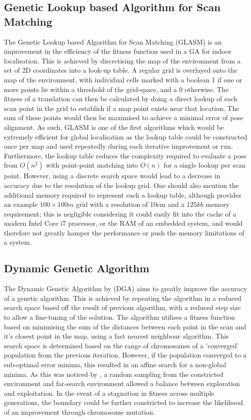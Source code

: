 \documentclass[authoryearcitations]{UoYCSproject}
\begin{document}
\subsection{Genetic Lookup based Algorithm for Scan Matching}
The Genetic Lookup based Algorithm for Scan Matching (GLASM) \cite{Lenac2007-xm} is an improvement in the efficiency of the fitness function used in a GA for indoor localisation. This is achieved by discretising the map of the environment from a set of 2D coordinates into a look-up table. A regular grid is overlayed onto the map of the environment, with individual cells marked with a boolean 1 if one or more points lie within a threshold of the grid-space, and a 0 otherwise. The fitness of a translation can then be calculated by doing a direct lookup of each scan point in the grid to establish if a map point exists near that location. The sum of these points would then be maximised to achieve a minimal error of pose alignment. As such, GLASM is one of the first algorithms which would be extremely efficient for global localisation as the lookup table could be constructed once per map and used repeatedly during each iterative improvement or run. Furthermore, the lookup table reduces the complexity required to evaluate a pose from $O(n^2)$ with point-point matching into $O(n)$ for a single lookup per scan point. However, using a discrete search space would lead to a decrease in accuracy due to the resolution of the lookup grid. One should also mention the additional memory required to represent such a lookup table, although \citeauthor{Lenac2007-xm} provides an example $100\times100m$ grid with a resolution of 10cm and a $125kb$ memory requirement; this is negligible considering it could easily fit into the cache of a modern Intel Core i7 processor, or the RAM of an embedded system, and would therefore not greatly hamper the performance or push the memory limitations of a system. 

\subsection{Dynamic Genetic Algorithm}
The Dynamic Genetic Algorithm by \citet{Chow2004-xc} (DGA) aims to greatly improve the accuracy of a genetic algorithm. This is achieved by repeating the algorithm in a reduced search space based off the result of previous algorithm, with a reduced step size to allow a fine-tuning of the solution. The algorithm utilises a fitness function based on minimising the sum of the distances between each point in the scan and it's closest point in the map, using a fast nearest neighbour algorithm. This search space is determined based on the range of chromosomes of a 'converged' population from the previous iteration. However, if the population converged to a sub-optimal error minima, this resulted in an affine search for a non-global minima. As this was noticed by \citeauthor{Chow2004-xc}, a random sampling from the constricted environment and far-search environment allowed a balance between exploration and exploitation. In the event of a stagnation in fitness across multiple generations, the boundary could be further constricted to increase the likelihood of an improvement through chromosome mutation. 
\end{document}
